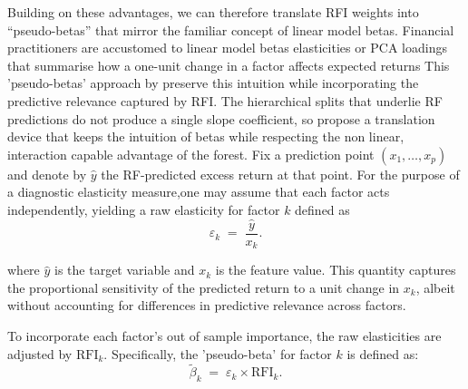 Building on these advantages, we can therefore translate RFI weights into “pseudo-betas” that mirror the familiar concept of linear model betas. Financial practitioners are accustomed to linear model betas elasticities or PCA loadings that summarise how a one-unit change in a factor affects expected returns This 'pseudo-betas' approach by  preserve this intuition while incorporating the predictive relevance captured by RFI.  The hierarchical splits that underlie RF predictions do not produce a single slope coefficient, so  propose a translation device that keeps the intuition of betas while respecting the non linear, interaction capable advantage of the forest. Fix a prediction point \((x_{1},\dots,x_{p})\) and denote by \(\hat{y}\) the RF-predicted excess return at that point.  For the purpose of a diagnostic elasticity measure,one may assume that each factor acts independently, yielding a raw elasticity for factor \(k\) defined as
\begin{equation}
    \varepsilon_{k} \;=\; \frac{\hat{y}}{x_{k}}.
\end{equation}

where \(\hat{y}\) is the target variable and \(x_{k}\) is the feature value. This quantity captures the proportional sensitivity of the predicted return to a unit change in \(x_{k}\), albeit without accounting for differences in predictive relevance across factors.

To incorporate each factor's out of sample importance, the raw elasticities are adjusted by \(\mathrm{RFI}_{k}\). Specifically, the 'pseudo-beta' for factor \(k\) is defined as:
\begin{equation}
\tilde{\beta}_{k} \;=\; \varepsilon_{k} \times \mathrm{RFI}_{k}.    
\end{equation}

